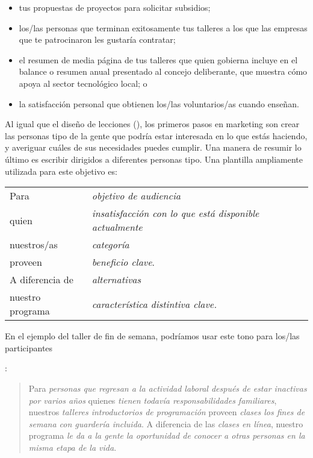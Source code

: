 \begin{itemize}

\item
	tus propuestas de proyectos para solicitar subsidios;

\item
 
	los/las personas que terminan exitosamente tus talleres
	a los que las empresas que te patrocinaron les gustaría contratar;

\item
   el resumen de media página de tus talleres que quien gobierna incluye 
   en el balance o resumen anual presentado al concejo deliberante,  
   que muestra cómo apoya al sector tecnológico local;
o

\item
   la satisfacción personal que obtienen los/las voluntarios/as cuando enseñan.
\end{itemize}

Al igual que el diseño de lecciones (),
los primeros pasos en marketing son crear
las personas tipo 
de la gente que podría estar interesada en lo que estás haciendo, 
y averiguar cuáles de sus necesidades puedes cumplir.
Una manera de resumir lo último es escribir  
dirigidos a diferentes personas tipo.
Una plantilla ampliamente utilizada para este objetivo es:

\begin{longtable}{ll}
  Para        & \emph{objetivo de audiencia} \\
  quien        & \emph{insatisfacción con lo que está disponible actualmente} \\
  nuestros/as        & \emph{categoría} \\
  proveen    & \emph{beneficio clave}. \\
  A diferencia de    & \emph{alternativas} \\
  nuestro programa    & \emph{característica distintiva clave.}
\end{longtable}

\noindent
En el ejemplo del taller de fin de semana,
podríamos usar este tono para los/las participantes

:
\begin{quote}

Para \emph{personas que regresan a la actividad laboral después de estar inactivas por varios años}
quienes \emph{tienen todavía responsabilidades familiares},
nuestros \emph{talleres introductorios de programación}
proveen \emph{clases los fines de semana con guardería incluida}.
A diferencia de las \emph{clases en línea},
nuestro programa \emph{le da a la gente la oportunidad de conocer a otras personas en la misma etapa de la vida}.

\end{quote}

